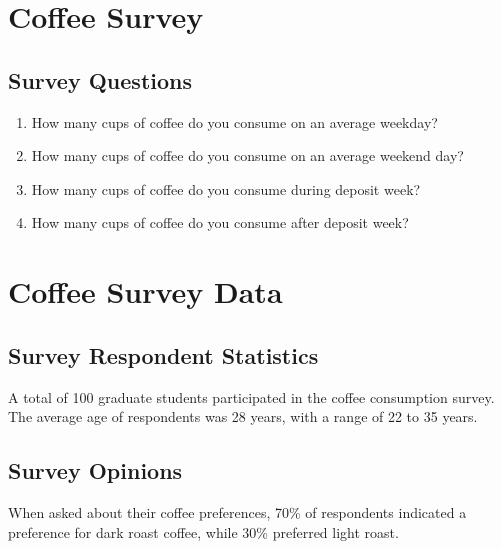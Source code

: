 \section{Coffee Survey}

\subsection{Survey Questions}\label{app:coffee_survey}

\begin{enumerate}
  \item How many cups of coffee do you consume on an average weekday?
  \item How many cups of coffee do you consume on an average weekend day?
  \item How many cups of coffee do you consume during deposit week?
  \item How many cups of coffee do you consume after deposit week?
\end{enumerate}

\section{Coffee Survey Data}

\subsection{Survey Respondent Statistics}
A total of 100 graduate students participated in the coffee consumption survey.
The average age of respondents was 28 years, with a range of 22 to 35 years.
\subsection{Survey Opinions}
When asked about their coffee preferences, 70\% of respondents indicated a
preference for dark roast coffee, while 30\% preferred light roast.